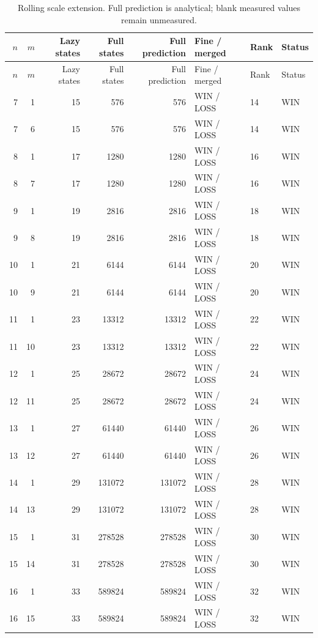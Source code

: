 \begin{longtable}{rrrrrlll}
\caption{Rolling scale extension. Full prediction is analytical; blank measured values remain unmeasured.}\\
\toprule
$n$ & $m$ & Lazy states & Full states & Full prediction & Fine / merged & Rank & Status \\
\midrule
\endfirsthead
\toprule
$n$ & $m$ & Lazy states & Full states & Full prediction & Fine / merged & Rank & Status \\
\midrule
\endhead
7 & 1 & 15 & 576 & 576 & WIN / LOSS & 14 & WIN \\
7 & 6 & 15 & 576 & 576 & WIN / LOSS & 14 & WIN \\
8 & 1 & 17 & 1280 & 1280 & WIN / LOSS & 16 & WIN \\
8 & 7 & 17 & 1280 & 1280 & WIN / LOSS & 16 & WIN \\
9 & 1 & 19 & 2816 & 2816 & WIN / LOSS & 18 & WIN \\
9 & 8 & 19 & 2816 & 2816 & WIN / LOSS & 18 & WIN \\
10 & 1 & 21 & 6144 & 6144 & WIN / LOSS & 20 & WIN \\
10 & 9 & 21 & 6144 & 6144 & WIN / LOSS & 20 & WIN \\
11 & 1 & 23 & 13312 & 13312 & WIN / LOSS & 22 & WIN \\
11 & 10 & 23 & 13312 & 13312 & WIN / LOSS & 22 & WIN \\
12 & 1 & 25 & 28672 & 28672 & WIN / LOSS & 24 & WIN \\
12 & 11 & 25 & 28672 & 28672 & WIN / LOSS & 24 & WIN \\
13 & 1 & 27 & 61440 & 61440 & WIN / LOSS & 26 & WIN \\
13 & 12 & 27 & 61440 & 61440 & WIN / LOSS & 26 & WIN \\
14 & 1 & 29 & 131072 & 131072 & WIN / LOSS & 28 & WIN \\
14 & 13 & 29 & 131072 & 131072 & WIN / LOSS & 28 & WIN \\
15 & 1 & 31 & 278528 & 278528 & WIN / LOSS & 30 & WIN \\
15 & 14 & 31 & 278528 & 278528 & WIN / LOSS & 30 & WIN \\
16 & 1 & 33 & 589824 & 589824 & WIN / LOSS & 32 & WIN \\
16 & 15 & 33 & 589824 & 589824 & WIN / LOSS & 32 & WIN \\
\bottomrule
\end{longtable}
